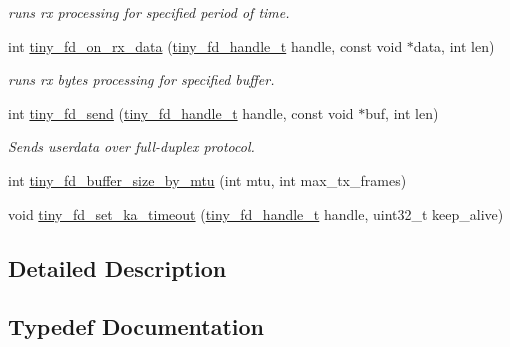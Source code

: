 \begin{DoxyCompactItemize}
\begin{DoxyCompactList}\small\item\em runs rx processing for specified period of time. \end{DoxyCompactList}\item 
int \hyperlink{group__FULL__DUPLEX__API_ga894298485a7b0901a61863ef7c2632b4}{tiny\+\_\+fd\+\_\+on\+\_\+rx\+\_\+data} (\hyperlink{group__FULL__DUPLEX__API_ga91e6b79431fe38570fb102701ef0b7e8}{tiny\+\_\+fd\+\_\+handle\+\_\+t} handle, const void $\ast$data, int len)
\begin{DoxyCompactList}\small\item\em runs rx bytes processing for specified buffer. \end{DoxyCompactList}\item 
int \hyperlink{group__FULL__DUPLEX__API_ga490157ee98ea6148f99a5bb1f26c5f60}{tiny\+\_\+fd\+\_\+send} (\hyperlink{group__FULL__DUPLEX__API_ga91e6b79431fe38570fb102701ef0b7e8}{tiny\+\_\+fd\+\_\+handle\+\_\+t} handle, const void $\ast$buf, int len)
\begin{DoxyCompactList}\small\item\em Sends userdata over full-\/duplex protocol. \end{DoxyCompactList}\item 
int \hyperlink{group__FULL__DUPLEX__API_ga19789bea5b5acd68804773f0d6b0e3f7}{tiny\+\_\+fd\+\_\+buffer\+\_\+size\+\_\+by\+\_\+mtu} (int mtu, int max\+\_\+tx\+\_\+frames)
\item 
void \hyperlink{group__FULL__DUPLEX__API_gab86352107f707322e0ca15febf586cba}{tiny\+\_\+fd\+\_\+set\+\_\+ka\+\_\+timeout} (\hyperlink{group__FULL__DUPLEX__API_ga91e6b79431fe38570fb102701ef0b7e8}{tiny\+\_\+fd\+\_\+handle\+\_\+t} handle, uint32\+\_\+t keep\+\_\+alive)
\end{DoxyCompactItemize}


\subsection{Detailed Description}


\subsection{Typedef Documentation}
\mbox{\label{group__FULL__DUPLEX__API_ga91e6b79431fe38570fb102701ef0b7e8}} 
